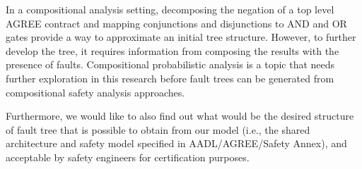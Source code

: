In a compositional analysis setting, decomposing the negation of a top level AGREE contract and mapping conjunctions and disjunctions to AND and OR gates provide a way to approximate an initial tree structure. However, to further develop the tree, it requires information from composing the results with the presence of faults. Compositional probabilistic analysis is a topic that needs further exploration in this research before fault trees can be generated from compositional safety analysis approaches. 

Furthermore, we would like to also find out what would be the desired structure of fault tree that is possible to obtain from our model (i.e., the shared architecture and safety model specified in AADL/AGREE/Safety Annex), and acceptable by safety engineers for certification purposes. 
